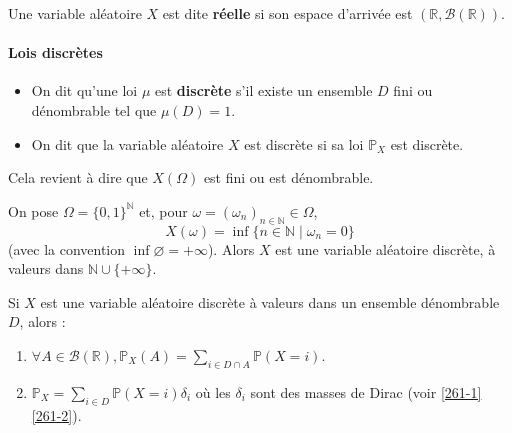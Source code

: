 
  \begin{definition}
    Une variable aléatoire $X$ est dite \textbf{réelle} si son espace d'arrivée est $(\mathbb{R}, \mathcal{B}(\mathbb{R}))$.
  \end{definition}

  \paragraph{Lois discrètes}


  \begin{definition}
    \begin{itemize}
      \item On dit qu'une loi $\mu$ est \textbf{discrète} s'il existe un ensemble $D$ fini ou dénombrable tel que $\mu(D) = 1$.
      \item On dit que la variable aléatoire $X$ est discrète si sa loi $\mathbb{P}_X$ est discrète.
    \end{itemize}
  \end{definition}


  \begin{remark}
    Cela revient à dire que $X(\Omega)$ est fini ou est dénombrable.
  \end{remark}

  \begin{example}
    On pose $\Omega=\{0,1\}^{\mathbb{N}}$ et, pour $\omega=(\omega_n)_{n\in\mathbb{N}}\in\Omega$,
    \[ X(\omega)=\inf\{n\in\mathbb{N}\mid \omega_n=0\} \]
    (avec la convention $\inf\varnothing=+\infty$). Alors $X$ est une variable aléatoire discrète, à valeurs dans $\mathbb{N}\cup\{+\infty\}$.
  \end{example}


  \begin{proposition}
    Si $X$ est une variable aléatoire discrète à valeurs dans un ensemble dénombrable $D$, alors :
    \begin{enumerate}[label={\bfseries(\roman*)}]
      \item $\forall A \in \mathcal{B}(\mathbb{R}), \mathbb{P}_X(A) = \sum_{i \in D \cap A} \mathbb{P}(X=i)$.
      \item $\mathbb{P}_X = \sum_{i \in D} \mathbb{P}(X=i) \delta_i$ où les $\delta_i$ sont des masses de Dirac (voir \cref{261-1} \cref{261-2}).
    \end{enumerate}
  \end{proposition}

